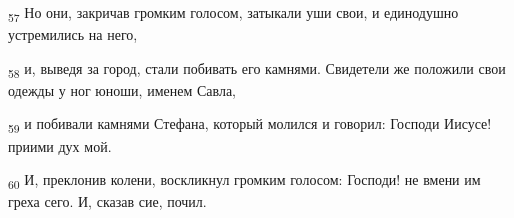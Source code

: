 \begin{tcolorbox}
\textsubscript{57} Но они, закричав громким голосом, затыкали уши свои, и единодушно устремились на него,
\end{tcolorbox}
\begin{tcolorbox}
\textsubscript{58} и, выведя за город, стали побивать его камнями. Свидетели же положили свои одежды у ног юноши, именем Савла,
\end{tcolorbox}
\begin{tcolorbox}
\textsubscript{59} и побивали камнями Стефана, который молился и говорил: Господи Иисусе! приими дух мой.
\end{tcolorbox}
\begin{tcolorbox}
\textsubscript{60} И, преклонив колени, воскликнул громким голосом: Господи! не вмени им греха сего. И, сказав сие, почил.
\end{tcolorbox}
